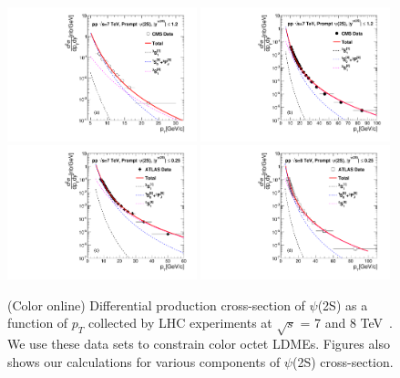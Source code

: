 \documentclass[aps,prc,preprint,superscriptaddress,showpacs,showkeys,amsmath]{revtex4-1}
\begin{document}
\begin{figure}
\includegraphics[width=0.49\textwidth]{Figures/Psi2S/Psi2S_CMS_LowPt.pdf}
\includegraphics[width=0.49\textwidth]{Figures/Psi2S/Psi2S_CMS_HighPt.pdf}
\includegraphics[width=0.49\textwidth]{Figures/Psi2S/Psi2S_ATLAS.pdf}
\includegraphics[width=0.49\textwidth]{Figures/Psi2S/Psi2S_ATLAS_8TeV.pdf}
\caption{(Color online) Differential production cross-section of $\psi$(2S) 
  as a function of $p_{T}$ collected by LHC experiments at $\sqrt{s}$ = 7 and 8 
TeV~\cite{Chatrchyan:2011kc,Khachatryan:2015rra,Aad:2015duc}. We use these data 
sets to constrain color octet LDMEs. Figures also shows our calculations for 
various components of $\psi$(2S) cross-section.}
\label{Fig:LDMEPsi2S}
\end{figure}
\end{document}
